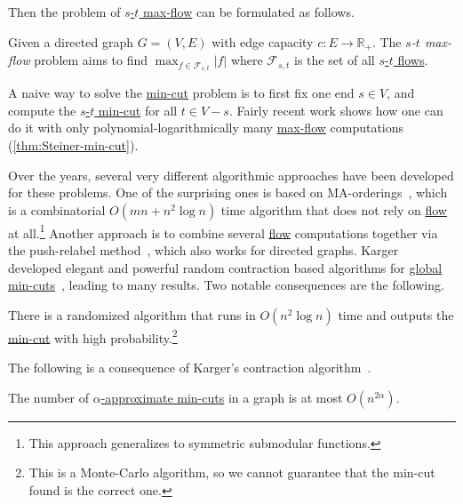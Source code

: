 Then the problem of \hyperref[prb:s-t-max-flow]{\(s\)-\(t\) max-flow} can be formulated as follows.

\begin{problem}\label{prb:s-t-max-flow}
Given a directed graph \(G = (V, E)\) with edge capacity \(c \colon E \to \mathbb{R} _{+}\). The \emph{\(s\)-\(t\) max-flow} problem aims to find \(\max _{f \in \mathcal{F} _{s, t}} \lvert f \rvert \) where \(\mathcal{F} _{s, t}\) is the set of all \hyperref[def:flow]{\(s\)-\(t\) flows}.
\end{problem}

A naive way to solve the \hyperref[prb:global-min-cut]{min-cut} problem is to first fix one end \(s \in V\), and compute the \hyperref[prb:s-t-min-cut]{\(s\)-\(t\) min-cut} for all \(t \in V - s\). Fairly recent work shows how one can do it with only polynomial-logarithmically many \hyperref[prb:s-t-max-flow]{max-flow} computations (\autoref{thm:Steiner-min-cut}).

Over the years, several very different algorithmic approaches have been developed for these problems. One of the surprising ones is based on MA-orderings~\cite{nagamochi1992computing}, which is a combinatorial \(O(mn + n^2 \log n)\) time algorithm that does not rely on \hyperref[def:flow]{flow} at all.\footnote{This approach generalizes to symmetric submodular functions.} Another approach is to combine several \hyperref[prb:s-t-max-flow]{flow} computations together via the push-relabel method~\cite{hao1994faster}, which also works for directed graphs. Karger developed elegant and powerful random contraction based algorithms for \hyperref[prb:global-min-cut]{global min-cuts}~\cite{karger1995random}, leading to many results. Two notable consequences are the following.

\begin{theorem}\label{thm:Karger-min-cut}
	There is a randomized algorithm that runs in \(O(n^2 \log n)\) time and outputs the \hyperref[prb:global-min-cut]{min-cut} with high probability.\footnote{This is a Monte-Carlo algorithm, so we cannot guarantee that the min-cut found is the correct one.}
\end{theorem}

The following is a consequence of Karger's contraction algorithm~\cite{karger1995random}.

\begin{theorem}\label{thm:number-approximate-min-cut}
	The number of \hyperref[def:approximate-min-cut]{\(\alpha \)-approximate min-cuts} in a graph is at most \(O(n^{2 \alpha })\).
\end{theorem}

